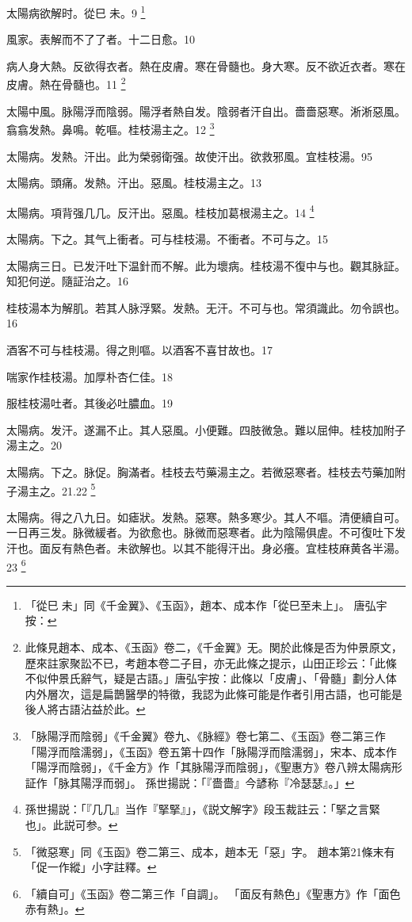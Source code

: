 太陽病欲解时。從巳{\sungii 𥁞}未。9
	\footnote{
		「從巳{\sungii 𥁞}未」同《千金翼》、《玉函》，趙本、成本作「從巳至未上」。
		唐弘宇按：
	}

風家。表解而不了了者。十二日愈。10

病人身大熱。反欲得衣者。熱在皮膚。寒在骨髓也。身大寒。反不欲近衣者。寒在皮膚。熱在骨髓也。11
	\footnote{
		此條見趙本、成本、《玉函》卷二，《千金翼》无。関於此條是否为仲景原文，歷來註家聚訟不已，考趙本卷二子目，亦无此條之提示，山田正珍云：「此條不似仲景氏辭气，疑是古語。」唐弘宇按：此條以「皮膚」、「骨髓」劃分人体内外層次，這是扁鵲醫學的特徵，我認为此條可能是作者引用古語，也可能是後人將古語沾益於此。
	}

太陽中風。{\khaai 脉}陽浮而陰弱。陽浮者熱自发。陰弱者汗自出。嗇嗇惡寒。淅淅惡風。翕翕发熱。鼻鳴。乾嘔。桂枝湯主之。12
	\footnote{
		「脉陽浮而陰弱」《千金翼》卷九、《脉經》卷七第二、《玉函》卷二第三作「陽浮而陰濡弱」，《玉函》卷五第十四作「脉陽浮而陰濡弱」，宋本、成本作「陽浮而陰弱」，《千金方》作「其脉陽浮而陰弱」，《聖惠方》卷八辨太陽病形証作「脉其陽浮而弱」。
		孫世揚説：「『嗇嗇』今諺称『冷瑟瑟』。」
	}

太陽病。发熱。汗出。此为榮弱衛强。故使汗出。欲救邪風。宜桂枝湯。95

太陽病。頭痛。发熱。汗出。惡風。桂枝湯主之。13

太陽病。項背强几几。反汗出。惡風。桂枝{\khaai 加葛根}湯主之。14
	\footnote{
		孫世揚説：「『几几』当作『掔掔』」，《説文解字》段玉裁註云：「掔之言緊也」。此説可参。
	}

太陽病。下之。其气上衝者。可与桂枝湯。不衝者。不可与之。15

太陽病三日。已发汗吐下温針而不解。此为壞病。桂枝湯不復中与也。觀其脉証。知犯何逆。隨証治之。16

桂枝湯本为解肌。若其人脉浮緊。发熱。无汗。不可与也。常須識此。勿令誤也。16

酒客不可与桂枝湯。得之則嘔。以酒客不喜甘故也。17

喘家作桂枝湯。加厚朴杏仁佳。18

服桂枝湯吐者。其後必吐膿血。19

太陽病。发汗。遂漏不止。其人惡風。小便難。四肢微急。難以屈伸。桂枝加附子湯主之。20

太陽病。下之。脉促。胸滿者。桂枝去芍藥湯主之。若微{\khaai 惡}寒者。桂枝去芍藥加附子湯主之。21.22
	\footnote{
		「微惡寒」同《玉函》卷二第三、成本，趙本无「惡」字。
		趙本第21條末有「促一作縱」小字註釋。
	}

太陽病。得之八九日。如瘧狀。发熱。惡寒。熱多寒少。其人不嘔。清便續自可。一日再三发。脉微緩者。为欲愈也。脉微而惡寒者。此为陰陽俱虗。不可復{\khaai 吐下}发汗也。面反有熱色者。未欲解也。以其不能得汗出。身必癢。宜桂枝麻黄各半湯。23
	\footnote{
		「續自可」《玉函》卷二第三作「自調」。
		「面反有熱色」《聖惠方》作「面色赤有熱」。
	}


